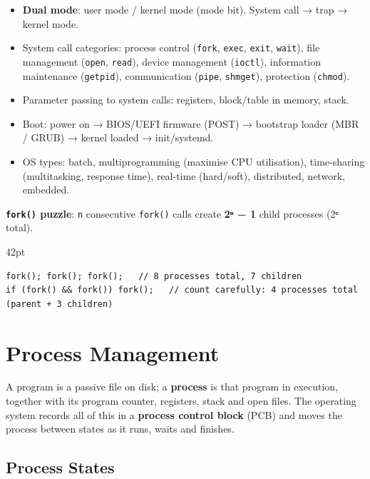 \begin{itemize}
\tightlist
\item
  \textbf{Dual mode}: user mode / kernel mode (mode bit). System call → trap → kernel mode.
\item
  System call categories: process control (\texttt{fork}, \texttt{exec}, \texttt{exit}, \texttt{wait}), file management (\texttt{open}, \texttt{read}), device management (\texttt{ioctl}), information maintenance (\texttt{getpid}), communication (\texttt{pipe}, \texttt{shmget}), protection (\texttt{chmod}).
\item
  Parameter passing to system calls: registers, block/table in memory, stack.
\item
  Boot: power on → BIOS/UEFI firmware (POST) → bootstrap loader (MBR / GRUB) → kernel loaded → init/systemd.
\item
  OS types: batch, multiprogramming (maximise CPU utilisation), time-sharing (multitasking, response time), real-time (hard/soft), distributed, network, embedded.
\end{itemize}

\textbf{\texttt{fork()} puzzle}: \texttt{n} consecutive \texttt{fork()} calls create \textbf{2ⁿ − 1} child processes (2ⁿ total).

\begin{listingblock}{42pt}
\begin{Verbatim}[fontsize=\fontsize{9.0}{10.9}\selectfont]
fork(); fork(); fork();   // 8 processes total, 7 children
if (fork() && fork()) fork();   // count carefully: 4 processes total (parent + 3 children)
\end{Verbatim}
\end{listingblock}

\needspace{161pt}

\hypertarget{p2-05--3-process-management}{%
\section{Process Management}\label{p2-05--3-process-management}}

A program is a passive file on disk; a \textbf{process} is that program in execution, together with its
program counter, registers, stack and open files. The operating system records all of this in a
\textbf{process control block} (PCB) and moves the process between states as it runs, waits and finishes.

\needspace{95pt}

\hypertarget{p2-05--31-process-states}{%
\subsection{Process States}\label{p2-05--31-process-states}}

